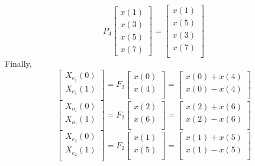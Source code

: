 \documentclass[journal,12pt,twocolumn]{IEEEtran}
\begin{document}
\begin{equation}
P_{4}
\begin{bmatrix}
x(1) \\ 
x(3) \\ 
x(5) \\
x(7)
\end{bmatrix}
 = 
\begin{bmatrix}
x(1) \\ 
x(5) \\ 
x(3) \\ 
x(7) \\
\end{bmatrix}
\end{equation}
Finally,
\begin{equation}
\begin{bmatrix}
X_{e_{1}}(0) \\ 
X_{e_{1}}(1)\\ 
\end{bmatrix}
= F_{2}
\begin{bmatrix}
x(0) \\ 
x(4) \\ 
\end{bmatrix}
=
\begin{bmatrix}
x(0)+x(4) \\ 
x(0)-x(4) \\ 
\end{bmatrix}
\end{equation}
\begin{equation}
\begin{bmatrix}
X_{o_{1}}(0) \\ 
X_{o_{1}}(1)\\ 
\end{bmatrix}
= F_{2}
\begin{bmatrix}
x(2) \\ 
x(6) \\ 
\end{bmatrix}
=
\begin{bmatrix}
x(2)+x(6) \\ 
x(2)-x(6) \\ 
\end{bmatrix}
\end{equation}
\begin{equation}
\begin{bmatrix}
X_{e_{2}}(0) \\ 
X_{e_{2}}(1)\\ 
\end{bmatrix}
= F_{2}
\begin{bmatrix}
x(1) \\ 
x(5) \\ 
\end{bmatrix}
=
\begin{bmatrix}
x(1)+x(5) \\ 
x(1)-x(5) \\ 
\end{bmatrix}
\end{equation}
\end{document}
